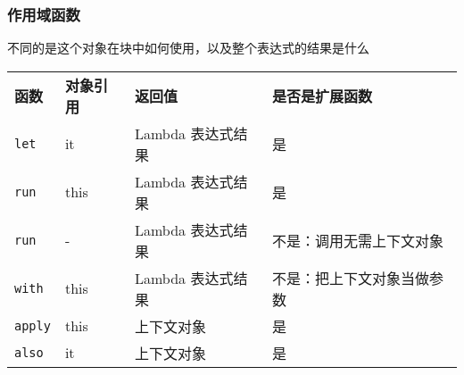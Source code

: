 \begin{frame}[fragile]
\frametitle{作用域函数}
\begin{quotebox}
    不同的是这个对象在块中如何使用，以及整个表达式的结果是什么
\end{quotebox}

\begin{table}[]
\begin{tabular}{llll}
\textbf{函数} & \textbf{对象引用} & \textbf{返回值} & \textbf{是否是扩展函数}\\
\texttt{let}   & it   & Lambda 表达式结果 & 是\\
\texttt{run}   & this & Lambda 表达式结果 & 是\\
\texttt{run}   & -    & Lambda 表达式结果 & 不是：调用无需上下文对象\\
\texttt{with}  & this & Lambda 表达式结果 & 不是：把上下文对象当做参数\\
\texttt{apply} & this & 上下文对象        & 是\\
\texttt{also}  & it   & 上下文对象        & 是\\
\end{tabular}
\end{table}
\end{frame}


